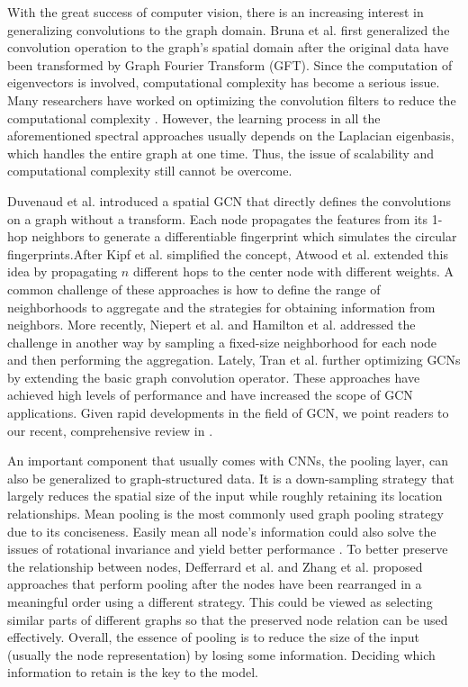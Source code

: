 \documentclass[conference]{IEEEtran}
\begin{document}
        With the great success of computer vision, there is an increasing interest in generalizing convolutions to the graph domain. Bruna et al.\cite{bruna2013spectral} first generalized the convolution operation to the graph's spatial domain after the original data have been transformed by Graph Fourier Transform (GFT). Since the computation of eigenvectors is involved, computational complexity has become a serious issue. Many researchers have worked on optimizing the convolution filters to reduce the computational complexity \cite{henaff2015deep,defferrard2016convolutional,li2018adaptive,levie2017cayleynets}. However, the learning process in all the aforementioned spectral approaches usually depends on the Laplacian eigenbasis, which handles the entire graph at one time. Thus, the issue of scalability and computational complexity still cannot be overcome.
        
        Duvenaud et al.\cite{duvenaud2015convolutional} introduced a spatial GCN that directly defines the convolutions on a graph without a transform. Each node propagates the features from its 1-hop neighbors to generate a differentiable fingerprint which simulates the circular fingerprints.After Kipf et al.\cite{kipf2016semi} simplified the concept, Atwood et al.\cite{atwood2016diffusion} extended this idea by propagating $n$ different hops to the center node with different weights. A common challenge of these approaches is how to define the range of neighborhoods to aggregate and the strategies for obtaining information from neighbors. More recently, Niepert et al. \cite{niepert2016learning} and Hamilton et al. \cite{hamilton2017inductive} addressed the challenge in another way by sampling a fixed-size neighborhood for each node and then performing the aggregation. Lately, Tran et al. \cite{van2018filter} further optimizing GCNs by extending the basic graph convolution operator. These approaches have achieved high levels of performance and have increased the scope of GCN applications. Given rapid developments in the field of GCN, we point readers to our recent, comprehensive review in  \cite{wu2019comprehensive}.
        
        An important component that usually comes with CNNs, the pooling layer, can also be generalized to graph-structured data. It is a down-sampling strategy that largely reduces the spatial size of the input while roughly retaining its location relationships. Mean pooling is the most commonly used graph pooling strategy due to its conciseness. Easily mean all node's information could also solve the issues of rotational invariance and yield better performance \cite{henaff2015deep}. To better preserve the relationship between nodes, Defferrard et al. \cite{defferrard2016convolutional} and Zhang et al. \cite{zhang2018end} proposed approaches that perform pooling after the nodes have been rearranged in a meaningful order using a different strategy. This could be viewed as selecting similar parts of different graphs so that the preserved node relation can be used effectively. Overall, the essence of pooling is to reduce the size of the input (usually the node representation) by losing some information. Deciding which information to retain is the key to the model. 
        
\end{document}
